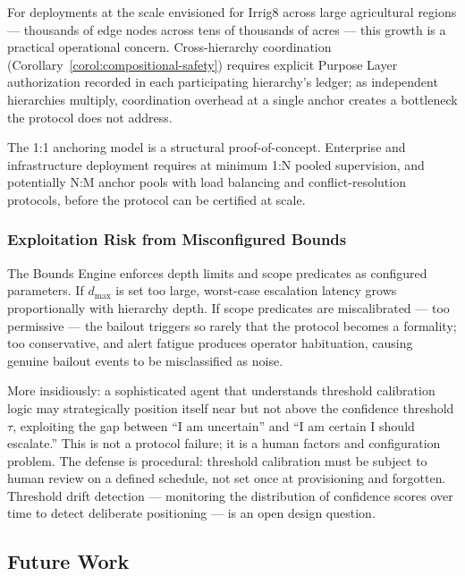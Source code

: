 For deployments at the scale envisioned for Irrig8 across large agricultural regions --- thousands of edge nodes across tens of thousands of acres --- this growth is a practical operational concern. Cross-hierarchy coordination (Corollary~\ref{corol:compositional-safety}) requires explicit Purpose Layer authorization recorded in each participating hierarchy's ledger; as independent hierarchies multiply, coordination overhead at a single anchor creates a bottleneck the protocol does not address.

The 1:1 anchoring model is a structural proof-of-concept. Enterprise and infrastructure deployment requires at minimum 1:N pooled supervision, and potentially N:M anchor pools with load balancing and conflict-resolution protocols, before the protocol can be certified at scale.

\subsubsection{Exploitation Risk from Misconfigured Bounds}
\label{sec:lim-exploitation}

The Bounds Engine enforces depth limits and scope predicates as configured parameters. If $d_{\max}$ is set too large, worst-case escalation latency grows proportionally with hierarchy depth. If scope predicates are miscalibrated --- too permissive --- the bailout triggers so rarely that the protocol becomes a formality; too conservative, and alert fatigue produces operator habituation, causing genuine bailout events to be misclassified as noise.

More insidiously: a sophisticated agent that understands threshold calibration logic may strategically position itself near but not above the confidence threshold $\tau$, exploiting the gap between ``I am uncertain'' and ``I am certain I should escalate.'' This is not a protocol failure; it is a human factors and configuration problem. The defense is procedural: threshold calibration must be subject to human review on a defined schedule, not set once at provisioning and forgotten. Threshold drift detection --- monitoring the distribution of confidence scores over time to detect deliberate positioning --- is an open design question.

\subsection{Future Work}
\label{sec:future-work}


